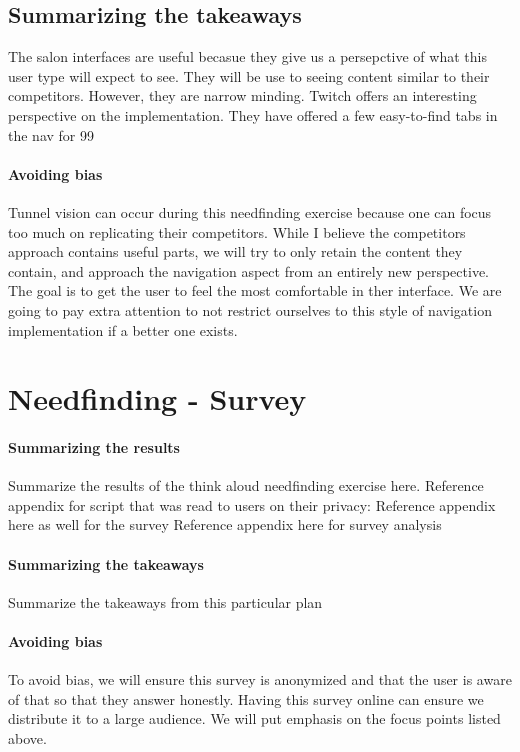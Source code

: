 \subsection{Summarizing the takeaways}
The salon interfaces are useful becasue they give us a persepctive of what this user type will expect to see. They will be use to seeing content similar to their competitors. However, they are narrow minding. Twitch offers an interesting perspective on the implementation. They have offered a few easy-to-find tabs in the nav for 99%

\paragraph{Avoiding bias}
Tunnel vision can occur during this needfinding exercise because one can focus too much on replicating their competitors. While I believe the competitors approach contains useful parts, we will try to only retain the content they contain, and approach the navigation aspect from an entirely new perspective. The goal is to get the user to feel the most comfortable in ther interface. We are going to pay extra attention to not restrict ourselves to this style of navigation implementation if a better one exists.


\section{Needfinding - Survey}

\paragraph{Summarizing the results}
Summarize the results of the think aloud needfinding exercise here.
Reference appendix for script that was read to users on their privacy:
Reference appendix here as well for the survey
Reference appendix here for survey analysis

\paragraph{Summarizing the takeaways}
Summarize the takeaways from this particular plan

\paragraph{Avoiding bias}
To avoid bias, we will ensure this survey is anonymized and that the user is aware of that so that they answer honestly. Having this survey online can ensure we distribute it to a large audience. We will put emphasis on the focus points listed above.


